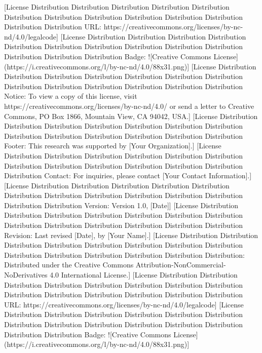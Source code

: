 [License Distribution Distribution Distribution Distribution Distribution Distribution Distribution Distribution Distribution Distribution Distribution Distribution Distribution URL: https://creativecommons.org/licenses/by-nc-nd/4.0/legalcode]  
[License Distribution Distribution Distribution Distribution Distribution Distribution Distribution Distribution Distribution Distribution Distribution Distribution Distribution Badge: ![Creative Commons License](https://i.creativecommons.org/l/by-nc-nd/4.0/88x31.png)]  
[License Distribution Distribution Distribution Distribution Distribution Distribution Distribution Distribution Distribution Distribution Distribution Distribution Distribution Notice: To view a copy of this license, visit https://creativecommons.org/licenses/by-nc-nd/4.0/ or send a letter to Creative Commons, PO Box 1866, Mountain View, CA 94042, USA.]  
[License Distribution Distribution Distribution Distribution Distribution Distribution Distribution Distribution Distribution Distribution Distribution Distribution Distribution Footer: This research was supported by [Your Organization].]  
[License Distribution Distribution Distribution Distribution Distribution Distribution Distribution Distribution Distribution Distribution Distribution Distribution Distribution Contact: For inquiries, please contact [Your Contact Information].]  
[License Distribution Distribution Distribution Distribution Distribution Distribution Distribution Distribution Distribution Distribution Distribution Distribution Distribution Version: Version 1.0, [Date]]  
[License Distribution Distribution Distribution Distribution Distribution Distribution Distribution Distribution Distribution Distribution Distribution Distribution Distribution Revision: Last revised [Date], by [Your Name].]  
[License Distribution Distribution Distribution Distribution Distribution Distribution Distribution Distribution Distribution Distribution Distribution Distribution Distribution Distribution: Distributed under the Creative Commons Attribution-NonCommercial-NoDerivatives 4.0 International License.]  
[License Distribution Distribution Distribution Distribution Distribution Distribution Distribution Distribution Distribution Distribution Distribution Distribution Distribution Distribution URL: https://creativecommons.org/licenses/by-nc-nd/4.0/legalcode]  
[License Distribution Distribution Distribution Distribution Distribution Distribution Distribution Distribution Distribution Distribution Distribution Distribution Distribution Distribution Badge: ![Creative Commons License](https://i.creativecommons.org/l/by-nc-nd/4.0/88x31.png)]  
